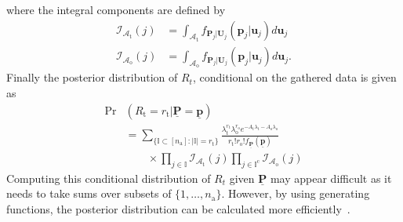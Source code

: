 where the integral components are defined by
\begin{align} \label{equation:IntegralComponentsT}
\mathcal{I}_{\mathcal{A}_{\mathrm{t}}}(j)
&= \int_{\mathcal{A}_{\mathrm{t}}} f_{\mathbf{P}_j|\mathbf{U}_j}
(\mathbf{p}_j|\mathbf{u}_j) d\mathbf{u}_j \\
\label{equation:IntegralComponentsO}
\mathcal{I}_{\mathcal{A}_{\mathrm{o}}}(j)
&= \int_{\mathcal{A}_{\mathrm{o}}} f_{\mathbf{P}_j|\mathbf{U}_j}
(\mathbf{p}_j|\mathbf{u}_j) d\mathbf{u}_j .
\end{align}
Finally the posterior distribution of $R_{t}$, conditional on the gathered data is given as
\begin{equation*}
\begin{split}
	\Pr & \left( R_{\mathrm{t}} = r_{\mathrm{t}}
	| \underline{\mathbf{P}} = \underline{\mathbf{p}} \right) \\
	&= \sum_{\{ \mathbb{I} \subset [n_{\mathrm{a}}]
		: |\mathbb{I}| = r_{\mathrm{t}} \}}
	\frac{\lambda_{\mathrm{t}}^{r_{\mathrm{t}}}
		\lambda_{\mathrm{o}}^{r_{\mathrm{o}}}
		e^{- A_{\mathrm{t}} \lambda_{\mathrm{t}}
			- A_{\mathrm{o}} \lambda_{\mathrm{o}}}}
	{r_{\mathrm{t}}! r_{\mathrm{o}}!
		f_{\underline{\mathbf{P}}}(\underline{\mathbf{p}})} \\
	&\qquad \times
	\prod_{j \in \mathbb{I}} \mathcal{I}_{\mathcal{A}_{\mathrm{t}}}(j)
	\prod_{j \in \mathbb{I}^{\mathrm{c}}} \mathcal{I}_{\mathcal{A}_{\mathrm{o}}}(j)
\end{split}
\end{equation*}
Computing this conditional distribution of $R_{t}$ given $\underline{\mathbf{P}}$ may appear difficult as it needs to take sums over subsets of $\{ 1, \ldots, n_{\mathrm{a}} \}$. However, by using generating functions, the posterior distribution can be calculated more efficiently~\cite{graham1994concrete}.

